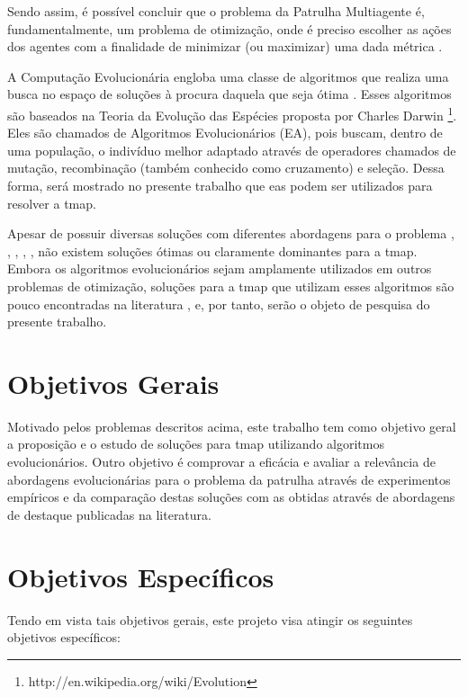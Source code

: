 Sendo assim, é possível concluir que o problema da Patrulha Multiagente é, 
fundamentalmente, um problema de otimização, onde é preciso escolher as ações 
dos agentes com a finalidade de minimizar (ou maximizar) uma dada métrica 
\citep{sampaiophd}.

A Computação Evolucionária engloba uma classe de algoritmos que realiza uma 
busca no espaço de soluções à procura daquela que seja ótima 
\citep{Luke2013Metaheuristics}. Esses algoritmos são baseados na Teoria da 
Evolução das Espécies proposta por Charles Darwin 
\footnote{http://en.wikipedia.org/wiki/Evolution}. Eles são chamados de 
Algoritmos Evolucionários (EA), pois buscam, dentro de uma população, 
o indivíduo melhor adaptado através de operadores chamados de mutação, 
recombinação (também conhecido como cruzamento) e seleção. Dessa forma, será 
mostrado no presente trabalho que \acp{ea} podem ser utilizados para resolver a 
\ac{tmap}.

Apesar de possuir diversas soluções com diferentes abordagens para o problema 
\citep{Chevaleyre:2004:TAM:1018411.1019013}, 
\citep{Machado:2002:MPE:1765317.1765332}, \citep{Almeida:2004:AAI}, 
\citep{4209122}, \citep{hernandez2013game}, não existem soluções ótimas ou 
claramente dominantes para a \ac{tmap}. Embora os algoritmos evolucionários 
sejam amplamente utilizados em outros problemas de otimização, soluções para a 
\ac{tmap} que utilizam esses algoritmos são pouco encontradas na 
literatura \citep{4630897}, \citep{6900280} e, por tanto, serão o objeto de 
pesquisa do presente trabalho.

\section{Objetivos Gerais}

Motivado pelos problemas descritos acima, este trabalho tem como objetivo geral 
a proposição e o estudo de soluções para \ac{tmap} utilizando algoritmos 
evolucionários. Outro objetivo é comprovar a eficácia e avaliar a relevância de 
abordagens evolucionárias para o problema da patrulha através de experimentos 
empíricos e da comparação destas soluções com as obtidas através de abordagens 
de destaque publicadas na literatura.

\section{Objetivos Específicos}

Tendo em vista tais objetivos gerais, este projeto visa atingir os seguintes 
objetivos específicos:

